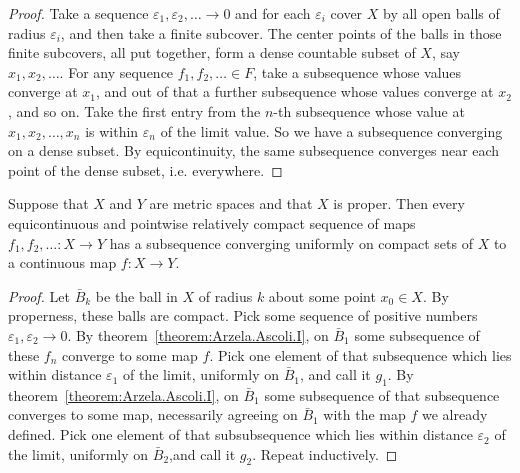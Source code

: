 \begin{proof}
Take a sequence \(\varepsilon_1, \varepsilon_2, \dots \to 0\) and for each \(\varepsilon_i\) cover \(X\) by all open balls of radius \(\varepsilon_i\), and then take a finite subcover.
The center points of the balls in those finite subcovers, all put together, form a dense countable subset of \(X\), say \(x_1, x_2, \dots\).
For any sequence \(f_1, f_2, \dots \in F\), take a subsequence whose values converge at \(x_1\), and out of that a further subsequence whose values converge at \(x_2\), and so on.
Take the first entry from the \(n\)-th subsequence whose value at \(x_1, x_2, \dots, x_n\) is within \(\varepsilon_n\) of the limit value.
So we have a subsequence converging on a dense subset.
By equicontinuity, the same subsequence converges near each point of the dense subset, i.e. everywhere.
\end{proof}
\begin{theorem}\label{theorem:Arzela.Ascoli.II}
Suppose that \(X\) and \(Y\) are metric spaces and that \(X\) is proper.
Then every equicontinuous and pointwise relatively compact sequence of maps \(f_1, f_2, \dots \colon X \to Y\) has a subsequence converging uniformly on compact sets of \(X\) to a continuous map \(f \colon X \to Y\).
\end{theorem}
\begin{proof}
Let \(\bar{B}_k\) be the ball in \(X\) of radius \(k\) about some point \(x_0 \in X\).
By properness, these balls are compact.
Pick some sequence of positive numbers \(\varepsilon_1, \varepsilon_2 \to 0\).
By theorem~\vref{theorem:Arzela.Ascoli.I}, on \(\bar{B}_1\) some subsequence of these \(f_n\) converge to some map \(f\).
Pick one element of that subsequence which lies within distance \(\varepsilon_1\) of the limit, uniformly on \(\bar{B}_1\), and call it \(g_1\).
By theorem~\vref{theorem:Arzela.Ascoli.I}, on \(\bar{B}_1\) some subsequence of that subsequence converges to some map, necessarily agreeing on \(\bar{B}_1\) with the map \(f\) we already defined.
Pick one element of that subsubsequence which lies within distance \(\varepsilon_2\) of the limit, uniformly on \(\bar{B}_2\),and call it \(g_2\).
Repeat inductively.
\end{proof}

